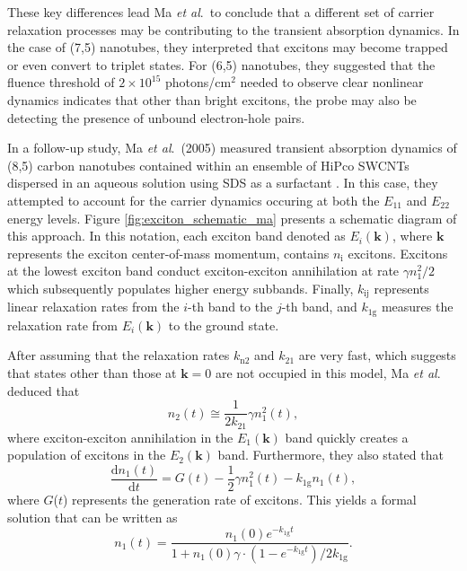 These key differences lead Ma \textit{et al}.\ to conclude that a different set of carrier relaxation processes may be contributing to the transient absorption dynamics. In the case of (7,5) nanotubes, they interpreted that excitons may become trapped or even convert to triplet states. For (6,5) nanotubes, they suggested that the fluence threshold of $2 \times 10^{15}$ photons/cm$^2$ needed to observe clear nonlinear dynamics indicates that other than bright excitons, the probe may also be detecting the presence of unbound electron-hole pairs.



In a follow-up study, Ma \textit{et al}.\ (2005) measured transient absorption dynamics of (8,5) carbon nanotubes contained within an ensemble of HiPco SWCNTs dispersed in an aqueous solution using SDS as a surfactant \cite{ma2005femtosecond}. In this case, they attempted to account for the carrier dynamics occuring at both the $E_{11}$ and $E_{22}$ energy levels. Figure \ref{fig:exciton_schematic_ma} presents a schematic diagram of this approach. In this notation, each exciton band denoted as $E_i(\mathbf{k})$, where $\mathbf{k}$ represents the exciton center-of-mass momentum, contains $n_\text{i}$ excitons. Excitons at the lowest exciton band conduct exciton-exciton annihilation at rate $\gamma n_1^2/2$ which subsequently populates higher energy subbands. Finally, $k_\text{ij}$ represents linear relaxation rates from the $i$-th band to the $j$-th band, and $k_\text{1g}$ measures the relaxation rate from $E_i(\mathbf{k})$ to the ground state.


After assuming that the relaxation rates $k_\text{n2}$ and $k_\text{21}$ are very fast, which suggests that states other than those at $\mathbf{k} = 0$ are not occupied in this model, Ma \textit{et al}. deduced that
\begin{equation}
	n_2(t) \cong \frac{1}{2 k_{21}} \gamma n^2_1(t),
	\label{eq:ma_n2}
\end{equation}
where exciton-exciton annihilation in the $E_1(\mathbf{k})$ band quickly creates a population of excitons in the $E_2(\mathbf{k})$ band. Furthermore, they also stated that
\begin{equation}
\frac{\mathrm{d} n_1(t)}{\mathrm{d}t} = G(t) - \frac{1}{2}\gamma n_1^2(t) - k_\text{1g} n_1(t),
\end{equation}
where $G$($t$) represents the generation rate of excitons. This yields a formal solution that can be written as
%
\begin{equation}
	n_1(t) = \frac{n_1(0)e^{-k_\text{1g}t}}{1 + n_1(0) \gamma\cdot(1 - e^{-k_\text{1g}t} )/2k_\text{1g}}.
	\label{eq:exciton_anih_ma_2005}
\end{equation}
%

